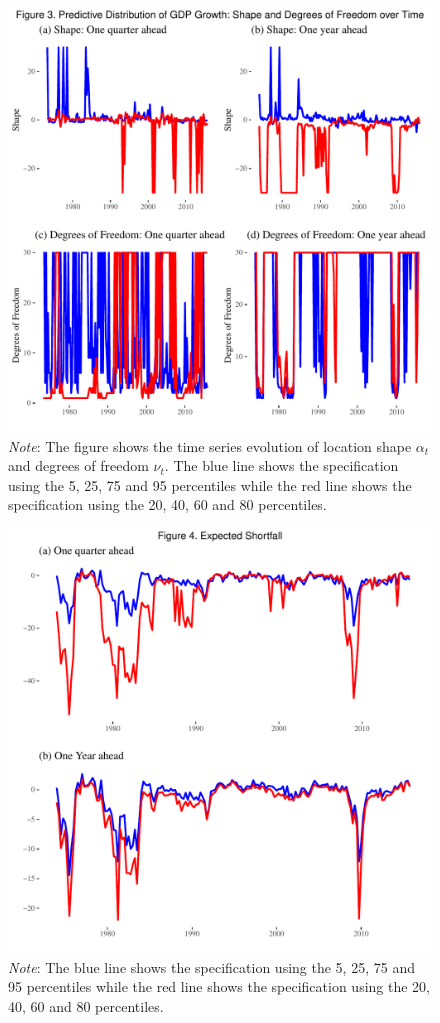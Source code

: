 \documentclass[
  11pt,
]{article}
\begin{document}
\begin{figure}
\centering
\includegraphics{figures/figure3.pdf}
\caption{\emph{Note}: The figure shows the time series evolution of
location shape \(\alpha_t\) and degrees of freedom \(\nu_t\). The blue
line shows the specification using the 5, 25, 75 and 95 percentiles
while the red line shows the specification using the 20, 40, 60 and 80
percentiles.}
\end{figure}

\begin{figure}
\centering
\includegraphics{figures/figure4.pdf}
\caption{\emph{Note}: The blue line shows the specification using the 5,
25, 75 and 95 percentiles while the red line shows the specification
using the 20, 40, 60 and 80 percentiles.}
\end{figure}
\end{document}
